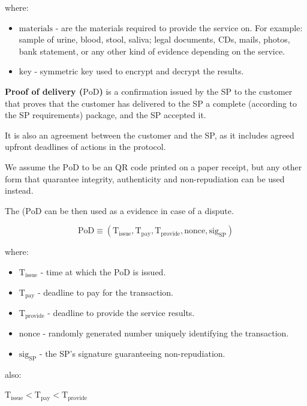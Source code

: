 \documentclass{ieeeaccess}
\begin{document}
where:

\begin{itemize}

\item $\mathrm{materials}$ - are the materials required to provide the service on. For example: sample of urine, blood, stool, saliva; legal documents, CDs, mails, photos, bank statement, or any other kind of evidence depending on the service.
\item $\mathrm{key}$ - symmetric key used to encrypt and decrypt the results.
\end{itemize}

\noindent \textbf
{Proof of delivery ($\mathrm{PoD}$)}\label{proof-of-delivery} is  a  confirmation  issued  by the SP to the customer that proves that the customer has delivered to the SP a complete (according to the SP requirements) package, and the SP accepted it.

It is also an agreement between the customer and the SP, as it includes agreed upfront deadlines of actions in the protocol.

We assume the $\mathrm{PoD}$ to be an QR code printed on a paper receipt, but any other form that quarantee integrity, authenticity and non-repudiation can be used instead. 

The ($\mathrm{PoD}$ can be then used as a evidence in case of a dispute.

$$\mathrm{PoD} \equiv (\mathrm{T}_\mathrm{issue}, \mathrm{T}_\mathrm{pay}, \mathrm{T}_\mathrm{provide}, \mathrm{nonce}, \mathrm{sig}_\mathrm{SP})$$

where:

\begin{itemize}

\item $\mathrm{T}_\mathrm{issue}$ - time at which the PoD is issued.
\item
  $\mathrm{T}_\mathrm{pay}$ - deadline to pay for the transaction.
\item
  $\mathrm{T}_\mathrm{provide}$ - deadline to provide the service results.
\item $\mathrm{nonce}$ - randomly generated number uniquely identifying the transaction.
\item $\mathrm{sig}_\mathrm{SP}$ - the SP's signature guaranteeing non-repudiation.
\end{itemize}

also:

\(\mathrm{T}_\mathrm{issue} < \mathrm{T}_\mathrm{pay} < \mathrm{T}_\mathrm{provide}\)
\end{document}

